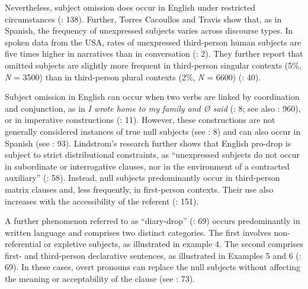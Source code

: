 \documentclass[
  letterpaper,
  DIV=11,
  numbers=noendperiod]{scrartcl}
\begin{document}
Nevertheless, subject omission does occur in English under restricted
circumstances (: 138). Further,
Torres Cacoullos and Travis show that, as in Spanish, the frequency of
unexpressed subjects varies across discourse types. In spoken data from
the USA, rates of unexpressed third-person human subjects are five times
higher in narratives than in conversation
(: 2). They further report that omitted subjects are
slightly more frequent in third-person singular contexts (5\%, \emph{N}
= 3500) than in third-person plural contexts (2\%, \emph{N} = 6600)
(: 40).

Subject omission in English can occur when two verbs are linked by
coordination and conjunction, as in \emph{I wrote home to my family and
Ø said} (: 8; see also : 960), or in imperative constructions
(: 11). However, these
constructions are not generally considered instances of true null
subjects (see : 8) and can also occur in Spanish (see
: 93).
Lindstrom's research further shows that English pro-drop is subject to
strict distributional constraints, as ``unexpressed subjects do not
occur in subordinate or interrogative clauses, nor in the environment of
a contracted auxiliary'' (:
58). Instead, null subjects predominantly occur in third-person matrix
clauses and, less frequently, in first-person contexts. Their use also
increases with the accessibility of the referent
(: 151).

A further phenomenon referred to as ``diary-drop''
(: 69) occurs predominantly in
written language and comprises two distinct categories. The first
involves non-referential or expletive subjects, as illustrated in
example 4. The second comprises first- and third-person declarative
sentences, as illustrated in Examples 5 and 6
(: 69). In these cases, overt
pronouns can replace the null subjects without affecting the meaning or
acceptability of the clause (see :
73).
\end{document}
